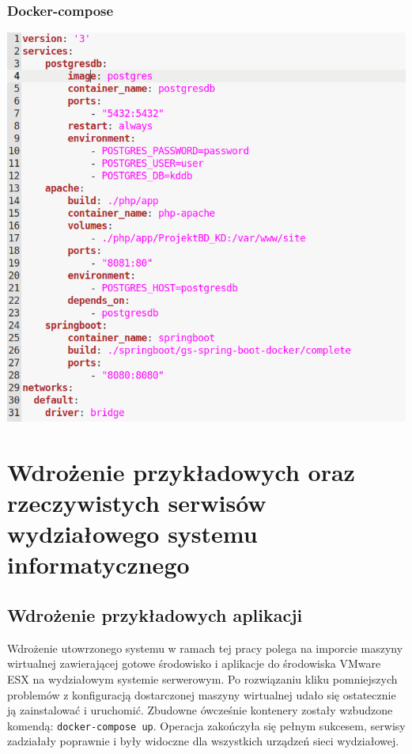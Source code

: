 \documentclass[polish, a4paper, 12pt, oneside]{book}
\begin{document}
\subsection{Docker-compose}
\begin{center}
\includegraphics[width=160mm]{docker_compose.png}
\end{center}

\chapter{Wdrożenie przykładowych oraz rzeczywistych serwisów wydziałowego systemu informatycznego}
\section{Wdrożenie przykładowych aplikacji}
Wdrożenie utowrzonego systemu w ramach tej pracy polega na imporcie maszyny wirtualnej zawierającej gotowe środowisko i aplikacje do środowiska VMware ESX na wydziałowym systemie serwerowym. Po rozwiązaniu kliku pomniejszych problemów z konfiguracją dostarczonej maszyny wirtualnej udało się ostatecznie ją zainstalować i uruchomić. Zbudowne ówcześnie kontenery zostały wzbudzone komendą: \texttt{docker-compose up}. Operacja zakończyła się pełnym sukcesem, serwisy zadziałały poprawnie i były widoczne dla wszystkich urządzeń sieci wydziałowej.
\end{document}

